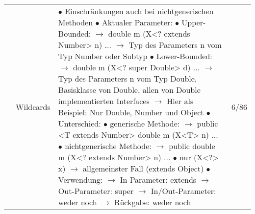 \documentclass[11pt,a4paper]{article}
\begin{document}
\begin{center}
\begin{longtable}[h]{ | p{2.3cm} | p{2.3cm} | p{12.6cm} | p{1.2cm} | }
	& Wildcards & \makecell[l]{$\bullet$ Einschränkungen auch bei nichtgenerischen Methoden \\ 
	$\bullet$ Aktualer Parameter:  \\
	\hspace{0.2cm} $\bullet$ Upper-Bounded: \\
	\hspace{0.4cm} $\rightarrow$ double m (X<? extends Number> n) ... \\ 
	\hspace{0.4cm} $\rightarrow$ Typ des Parameters n vom Typ Number oder Subtyp \\
	\hspace{0.2cm} $\bullet$ Lower-Bounded: \\
	\hspace{0.4cm} $\rightarrow$ double m (X<? super Double> d) ... \\
	\hspace{0.4cm} $\rightarrow$ Typ des Parameters n vom Typ Double, Basisklasse \\ 
	\hspace{1cm} von Double, allen von Double implementierten Interfaces \\ 
	\hspace{0.4cm} $\rightarrow$ Hier als Beispiel: Nur Double, Number und Object \\
	$\bullet$ Unterschied: \\
	\hspace{0.4cm} $\bullet$ generische Methode: \\ 
	\hspace{0.6cm} $\rightarrow$ public <T extends Number> double m (X<T> n) ... \\ 
	\hspace{0.4cm} $\bullet$ nichtgenerische Methode: \\
	\hspace{0.6cm} $\rightarrow$ public double m (X<? extends Number> n) ... \\
	$\bullet$ nur (X<?> x) $\rightarrow$ allgemeinster Fall (extends Object)\\
	$\bullet$ Verwendung: \\
	\hspace{0.4cm} $\rightarrow$ In-Parameter: extends \\
	\hspace{0.4cm} $\rightarrow$ Out-Parameter: super \\
	\hspace{0.4cm} $\rightarrow$ In/Out-Parameter: weder noch \\
	\hspace{0.4cm} $\rightarrow$ Rückgabe: weder noch} & 6/86 \\ \cline{2-4}
	

\end{longtable}
\end{center}
\end{document}
